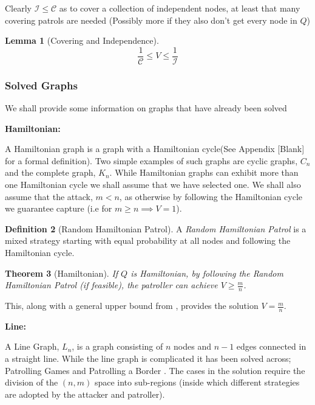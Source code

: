 \documentclass[a4paper,10pt]{article}
\newtheorem{theorem}{Theorem}[section]
\newtheorem{lemma}[theorem]{Lemma}
\theoremstyle{definition}
\newtheorem{definition}[theorem]{Definition}
\theoremstyle{definition}
\theoremstyle{remark}
\theoremstyle{definition}
\begin{document}
Clearly $\mathcal{I} \leq \mathcal{C}$ as to cover a collection of independent nodes, at least that many covering patrols are needed (Possibly more if they also don't get every node in $Q$)

\begin{lemma}[Covering and Independence]
$$ \frac{1}{\mathcal{C}} \leq V \leq \frac{1}{\mathcal{I}} $$
\end{lemma}

\subsubsection{Solved Graphs}
We shall provide some information on graphs that have already been solved

\textbf{Hamiltonian:}

A Hamiltonian graph is a graph with a Hamiltonian cycle(See Appendix [Blank] for a formal definition). Two simple examples of such graphs are cyclic graphs, $C_{n}$ and the complete graph, $K_{n}$. While Hamiltonian graphs can exhibit more than one Hamiltonian cycle we shall assume that we have selected one. We shall also assume that the attack, $m < n$, as otherwise by following the Hamiltonian cycle we guarantee capture (i.e for $m \geq n \implies V=1$).

\begin{definition}[Random Hamiltonian Patrol]
A \textit{Random Hamiltonian Patrol} is a mixed strategy starting with equal probability at all nodes and following the Hamiltonian cycle.
\end{definition}

\begin{theorem}[Hamiltonian]
If $Q$ is Hamiltonian, by following the Random Hamiltonian Patrol (if feasible), the patroller can achieve $V \geq \frac{m}{n}$.
\end{theorem}

This, along with a general upper bound from \citep{Alpern2011}, provides the solution $V=\frac{m}{n}$.

\textbf{Line:}

A Line Graph, $L_{n}$, is a graph consisting of $n$ nodes and $n-1$ edges connected in a straight line.  While the line graph is complicated it has been solved across; Patrolling Games \cite{Alpern2011} and Patrolling a Border \cite{Papadaki2016}. The cases in the solution require the division of the $(n,m)$ space into sub-regions (inside which different strategies are adopted by the attacker and patroller).
\end{document}

